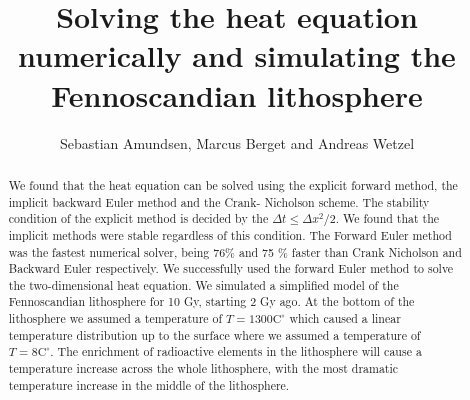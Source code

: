 \documentclass{article}
\begin{document}
\title{Solving the heat equation numerically and simulating the Fennoscandian lithosphere}
\author{Sebastian Amundsen, Marcus Berget and Andreas Wetzel}

\maketitle

\begin{abstract}

We found that the heat equation can be solved using the explicit forward method, the implicit backward Euler method and the Crank- Nicholson scheme. The stability condition of the explicit method is decided by the $\Delta t \leq \Delta x^2/2$. We found that the implicit methods were stable regardless of this condition. The Forward Euler method was the fastest numerical solver, being 76\% and 75 \% faster than Crank Nicholson and Backward Euler respectively. We successfully used the forward Euler method to solve the two-dimensional heat equation. We simulated a simplified model of the Fennoscandian lithosphere for 10 Gy, starting 2 Gy ago. At the bottom of the lithosphere we assumed a temperature of $T=1300\text{C}^{\circ}$ which caused a linear temperature distribution up to the surface where we assumed a temperature of $T=8\text{C}^{\circ}$. The enrichment of radioactive elements in the lithosphere will cause a temperature increase across the whole lithosphere, with the most dramatic temperature increase in the middle of the lithosphere.
\end{abstract}
\end{document}
